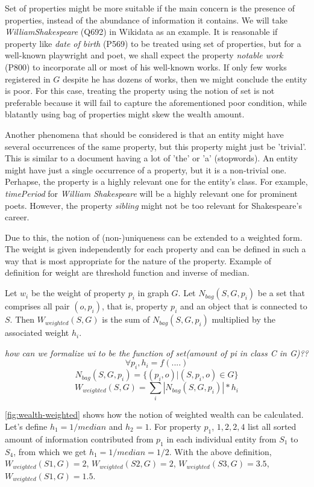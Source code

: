 Set of properties might be more suitable if the main concern is the presence of properties, instead of the abundance of information it contains. We will take \textit{WilliamShakespeare} (Q692) in Wikidata as an example. It is reasonable if property like  \textit{date of birth} (P569) to be treated using set of properties, but for a well-known playwright and poet, we shall expect the property \textit{notable work} (P800) to incorporate all or most of his well-known works. If only few works registered in \(G\) despite he has dozens of works, then we might conclude the entity is poor. For this case, treating the property using the notion of set is not preferable because it will fail to capture the aforementioned poor condition, while blatantly using bag of properties might skew the wealth amount.

Another phenomena that should be considered is that an entity might have several occurrences of the same property, but this property might just be 'trivial'. This is similar to a document having a lot of 'the' or 'a' (stopwords). An entity might have just a single occurrence of a property, but it is a non-trivial one. Perhapse, the property is a highly relevant one for the entity's class. For example, \textit{timePeriod} for \textit{William Shakespeare} will be a highly relevant one for prominent poets. However, the property \textit{sibling} might not be too relevant for Shakespeare's career.

Due to this, the notion of (non-)uniqueness can be extended to a weighted form. The weight is given independently for each property and can be defined in such a way that is most appropriate for the nature of the property. Example of definition for weight are threshold function and inverse of median.

Let \(w_i\) be the weight of property \(p_i\) in graph \(G\). Let \(N_{bag}(S,G,p_i)\) be a set that comprises all pair  \((o,p_i)\), that is, property \(p_i\) and an object that is connected to \(S\). Then \(W_{weighted}(S, G)\) is the sum of \(N_{bag}(S,G,p_i)\) multiplied by the associated weight \(h_i\).

\textit{how can we formalize wi to be the function of set(amount of pi in class C in G)??}
\[
    \forall p_i, h_i = f(....)
\]
\[
    N_{bag}(S,G,p_i) = \{(p_i, o) | (S, p_i, o) \in G\}
\]
\[
    W_{weighted}(S, G) = \sum_i |N_{bag}(S,G,p_i)| * h_i
\]

\autoref{fig:wealth-weighted} shows how the notion of weighted wealth can be calculated. Let's define \(h_1 = 1/median\) and \(h_2 = 1\). For property \(p_1\), \({1, 2, 2, 4}\) list all sorted amount of information contributed from \(p_1\) in each individual entity from \(S_1\) to \(S_4\), from which we get \(h_1 = 1/median = 1/2\). With the above definition, \(W_{weighted}(S1, G) = 2\), \(W_{weighted}(S2, G) = 2\), \(W_{weighted}(S3, G) = 3.5\), \(W_{weighted}(S1, G) = 1.5\).

